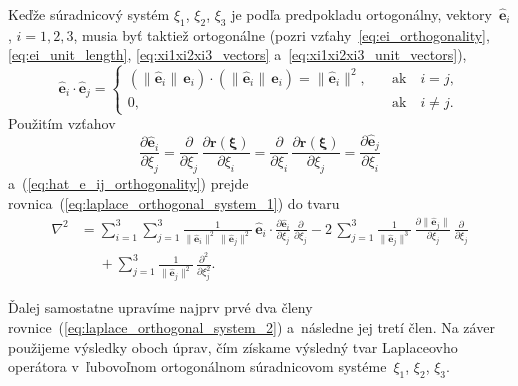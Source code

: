 \documentclass[a4paper, 12pt]{book}
\let\vec\mathbf
\begin{document}
Keďže súradnicový systém $\xi_1$, $\xi_2$, $\xi_3$ je podľa predpokladu 
ortogonálny, vektory~$\hat{\vec e}_i$, $i = 1, 2, 3$, musia byť taktiež 
ortogonálne (pozri vzťahy~\ref{eq:ei_orthogonality}, \ref{eq:ei_unit_length}, 
\ref{eq:xi1xi2xi3_vectors} a~\ref{eq:xi1xi2xi3_unit_vectors}),
%
\begin{equation}
\label{eq:hat_e_ij_orthogonality}
\hat{\vec e}_i \cdot \hat{\vec e}_j =
%
\begin{cases}
\left( \| \hat{\vec e}_i \| \, \vec e_i \right) \cdot \left( \| \hat{\vec e}_i 
\| \, \vec e_i \right) = \| \hat{\vec e}_i \|^2{,} \quad &\textrm{ak} \quad 
i = j{,}\\
0{,} \quad &\textrm{ak} \quad i \neq j{.}
\end{cases}
\end{equation}
%
Použitím vzťahov
%
\begin{equation}
\label{eq:partials_hat_e}
\frac{\partial \hat{\vec e}_i}{\partial \xi_j} = \frac{\partial}{\partial 
\xi_j} \, \frac{\partial \vec r(\boldsymbol \xi)}{\partial \xi_i} 
= \frac{\partial}{\partial \xi_i} \, \frac{\partial \vec r(\boldsymbol 
\xi)}{\partial \xi_j} = \frac{\partial \hat{\vec e}_j}{\partial \xi_i}
\end{equation}
%
a~(\ref{eq:hat_e_ij_orthogonality}) prejde 
rovnica~(\ref{eq:laplace_orthogonal_system_1}) do tvaru
%
\begin{equation}
\label{eq:laplace_orthogonal_system_2}
\begin{split}
\nabla^2 &= \sum_{i = 1}^{3} \sum_{j = 1}^3 \frac{1}{\| \hat{\vec e}_i \|^2 \, 
\| \hat{\vec e}_j \|^2} \, \hat{\vec e}_i \cdot \frac{\partial \hat{\vec 
e}_i}{\partial \xi_j} \, \frac{\partial}{\partial \xi_j}
- 2\, \sum_{j = 1}^{3} \frac{1}{\|\hat{\vec e}_j \|^3} \, \frac{\partial \| 
\hat{\vec e}_j \|}{\partial \xi_j} \, \frac{\partial}{\partial \xi_j}\\
%
&\phantom{={}}+ \sum_{j = 1}^3 \frac{1}{\| \hat{\vec e}_j \|^2} \, 
\frac{\partial^2}{\partial \xi_j^2}{.}
\end{split}
%
\end{equation}

Ďalej samostatne upravíme najprv prvé dva členy 
rovnice~(\ref{eq:laplace_orthogonal_system_2}) a~následne jej tretí člen.  Na 
záver použijeme výsledky oboch úprav, čím získame výsledný tvar Laplaceovho 
operátora v~ľubovoľnom ortogonálnom súradnicovom systéme~$\xi_1$, $\xi_2$, 
$\xi_3$.
\end{document}
